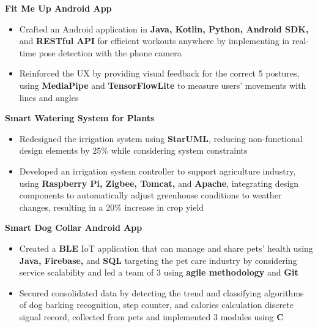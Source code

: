 \documentclass[a4paper,10.5pt]{article}
\begin{document}
\textbf{Fit Me Up Android App}
\vspace{-0.5em} %
\begin{itemize}[topsep=0pt, partopsep=0pt, parsep=0pt, itemsep=0pt]
    \item Crafted an Android application in \textbf{Java, Kotlin, Python, Android SDK,} and \textbf{RESTful API} for efficient workouts anywhere by implementing in real-time pose detection with the phone camera
    \item Reinforced the UX by providing visual feedback for the correct 5 postures, using \textbf{MediaPipe} and \textbf{TensorFlowLite} to measure users' movements with lines and angles
\end{itemize}
\vspace{-0.3em} %

\textbf{Smart Watering System for Plants}
\vspace{-0.5em} %
\begin{itemize}[topsep=0pt, partopsep=0pt, parsep=0pt, itemsep=0pt]
    \item Redesigned the irrigation system using \textbf{StarUML}, reducing non-functional design elements by 25\% while considering system constraints
    \item Developed an irrigation system controller to support agriculture industry, using \textbf{Raspberry Pi, Zigbee, Tomcat,} and \textbf{Apache}, integrating design components to automatically adjust greenhouse conditions to weather changes, resulting in a 20\% increase in crop yield
\end{itemize}
\vspace{-0.3em} %


\textbf{Smart Dog Collar Android App}
\vspace{-0.5em} %
\begin{itemize}[topsep=0pt, partopsep=0pt, parsep=0pt, itemsep=0pt]
    \item Created a \textbf{BLE} IoT application that can manage and share pets’ health using \textbf{Java, Firebase,} and \textbf{SQL} targeting the pet care industry by considering service scalability and led a team of 3 using \textbf{agile methodology} and \textbf{Git}
    \item Secured consolidated data by detecting the trend and classifying algorithms of dog barking recognition, step counter, and calories calculation discrete signal record, collected from pets and implemented 3 modules using \textbf{C}
\end{itemize}
\vspace{-0em} %
\end{document}
